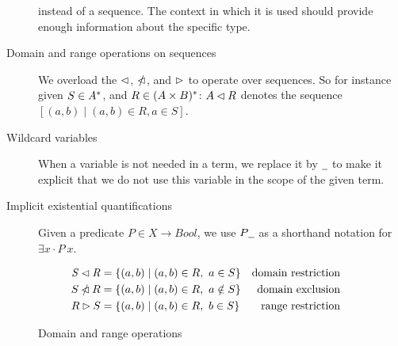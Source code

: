 \begin{description}
  instead of a sequence. The context in which it is used should provide enough
  information about the specific type.
\item[Domain and range operations on sequences] We overload the $\lhd$,
  $\mathbin{\slashed{\lhd}}$, and $\rhd$ to operate over sequences. So for
  instance given $S \in A^{*}$, and $R \in (A \times B)^{*}$:
  $A \lhd R$ denotes the sequence
  $[ (a, b) \mid (a, b) \in R, a \in S]$.
\item[Wildcard variables] When a variable is not needed in a term, we replace
  it by $\wcard$ to make it explicit that we do not use this variable in the
  scope of the given term.
\item[Implicit existential quantifications] Given a predicate
  $P \in X \to Bool$, we use $P \wcard$ as a shorthand notation for
  $\exists x \cdot P~x$.
\end{description}

\begin{figure}[htb]
  \begin{align*}
    \mathit{S} \lhd \mathit{R}
    & = \{ (a, b) \mid (a, b) \in R, ~ a \in S \}
    & \text{domain restriction}
    \\
    S \mathbin{\slashed{\lhd}} R
    & = \{ (a, b) \mid (a, b) \in R, ~ a \notin S \}
    & \text{domain exclusion}
    \\
    R \rhd S
    & = \{ (a, b) \mid (a, b) \in R, ~ b \in S \}
    & \text{range restriction}
  \end{align*}
  \caption{Domain and range operations}
  \label{fig:domain-and-range-ops}
\end{figure}
